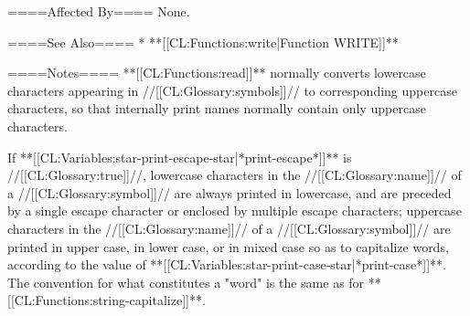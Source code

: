 ====Affected By====
None.

====See Also====
  * **[[CL:Functions:write|Function WRITE]]**

====Notes====
**[[CL:Functions:read]]** normally converts lowercase characters appearing in //[[CL:Glossary:symbols]]// to corresponding uppercase characters, so that internally print names normally contain only uppercase characters.

If **[[CL:Variables:star-print-escape-star|*print-escape*]]** is //[[CL:Glossary:true]]//, lowercase characters in the //[[CL:Glossary:name]]// of a //[[CL:Glossary:symbol]]// are always printed in lowercase, and are preceded by a single escape character or enclosed by multiple escape characters; uppercase characters in the //[[CL:Glossary:name]]// of a //[[CL:Glossary:symbol]]// are printed in upper case, in lower case, or in mixed case so as to capitalize words, according to the value of **[[CL:Variables:star-print-case-star|*print-case*]]**. The convention for what constitutes a "word" is the same as for **[[CL:Functions:string-capitalize]]**.

  

